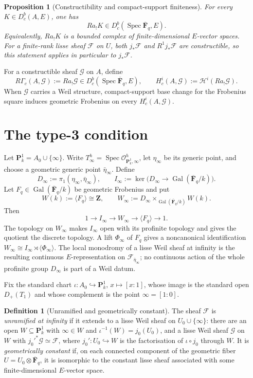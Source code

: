 \documentclass[10pt]{article}
\newtheorem{proposition}[theorem]{Proposition}
\theoremstyle{definition}
\newtheorem{definition}[theorem]{Definition}
\newcommand{\Fbar}{\overline{\mathbf F}_q}
\newcommand{\Pone}{\mathbf P^1}
\newcommand{\Spec}{\operatorname{Spec}}
\newcommand{\Gal}{\operatorname{Gal}}
\newcommand{\RGammac}{R\Gamma_c}
\begin{document}
\begin{proposition}[Constructibility and compact-support finiteness]
For every \(K\in D^b_c(A,E)\), one has
\[
  Ra_!K\in D^b_c(\Spec\Fbar,E).
\]
Equivalently, \(Ra_!K\) is a bounded complex of finite-dimensional
\(E\)-vector spaces.  For a finite-rank lisse sheaf \(\mathcal F\) on \(U\),
both \(j_*\mathcal F\) and \(R^1j_*\mathcal F\) are constructible, so this
statement applies in particular to \(j_*\mathcal F\).
\end{proposition}

For a constructible sheaf \(\mathcal G\) on \(A\), define
\[
  \RGammac(A,\mathcal G):=Ra_!\mathcal G\in D^b_c(\Spec\Fbar,E),
  \qquad
  H_c^i(A,\mathcal G):=\mathcal H^i(Ra_!\mathcal G).
\]
When \(\mathcal G\) carries a Weil structure, compact-support base change
for the Frobenius square induces geometric Frobenius on every
\(H_c^i(A,\mathcal G)\).

\section{The type-3 condition}

Let \(\Pone_k=A_0\cup\{\infty\}\).  Write
\(T_\infty^h=\Spec\mathcal O^h_{\Pone_k,\infty}\), let
\(\eta_\infty\) be its generic point, and choose a geometric generic point
\(\bar\eta_\infty\).  Define
\[
  D_\infty:=\pi_1(\eta_\infty,\bar\eta_\infty),
  \qquad
  I_\infty:=\ker\bigl(D_\infty\longrightarrow\Gal(\Fbar/k)\bigr).
\]
Let \(F_q\in\Gal(\Fbar/k)\) be geometric Frobenius and put
\[
 W(k):=\langle F_q\rangle\cong\mathbf Z,
 \qquad
 W_\infty:=D_\infty\times_{\Gal(\Fbar/k)}W(k).
\]
Then
\[
 1\longrightarrow I_\infty\longrightarrow W_\infty
   \longrightarrow\langle F_q\rangle\longrightarrow1.
\]
The topology on \(W_\infty\) makes \(I_\infty\) open with its profinite
topology and gives the quotient the discrete topology.  A lift
\(\Phi_\infty\) of \(F_q\) gives a noncanonical identification
\(W_\infty\cong I_\infty\rtimes\langle\Phi_\infty\rangle\).  The local
monodromy of a lisse Weil sheaf at infinity is the resulting continuous
\(E\)-representation on \(\mathcal F_{\bar\eta_\infty}\); no continuous
action of the whole profinite group \(D_\infty\) is part of a Weil datum.

Fix the standard chart \(\iota:A_0\hookrightarrow\Pone_k\),
\(x\mapsto[x:1]\), whose image is the standard open \(D_+(T_1)\) and whose
complement is the point \(\infty=[1:0]\).

\begin{definition}[Unramified and geometrically constant]
The sheaf \(\mathcal F\) is \emph{unramified at infinity} if it extends
to a lisse Weil sheaf on \(U_0\cup\{\infty\}\): there are an open
\(W\subseteq\Pone_k\) with \(\infty\in W\) and \(\iota^{-1}(W)=j_0(U_0)\), and
a lisse Weil sheaf \(\mathcal G\) on \(W\) with
\(j_0'^*\mathcal G\simeq\mathcal F\), where \(j_0':U_0\hookrightarrow W\)
is the factorisation of \(\iota\circ j_0\) through \(W\).  It is
\emph{geometrically constant} if, on each connected component of the
geometric fiber \(U=U_0\otimes\Fbar\), it is isomorphic to the constant
lisse sheaf associated with some finite-dimensional \(E\)-vector space.
\end{definition}
\end{document}
